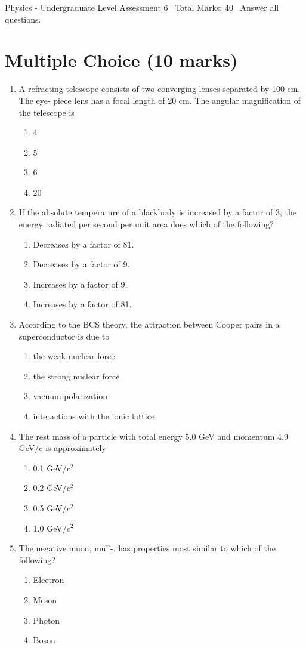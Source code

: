 \documentclass[12pt]{article}
\begin{document}
\begin{center}
Physics - Undergraduate Level Assessment 6 \
Total Marks: 40 \
Answer all questions.
\end{center}

\section*{Multiple Choice (10 marks)}
\begin{enumerate}[label=\arabic*.]
\item A refracting telescope consists of two converging lenses separated by 100 cm. The eye- piece lens has a focal length of 20 cm. The angular magnification of the telescope is
\begin{enumerate}[label=(\alph*)]
    \item 4
    \item 5
    \item 6
    \item 20
\end{enumerate}
\item If the absolute temperature of a blackbody is increased by a factor of 3, the energy radiated per second per unit area does which of the following?
\begin{enumerate}[label=(\alph*)]
    \item Decreases by a factor of 81.
    \item Decreases by a factor of 9.
    \item Increases by a factor of 9.
    \item Increases by a factor of 81.
\end{enumerate}
\item According to the BCS theory, the attraction between Cooper pairs in a superconductor is due to
\begin{enumerate}[label=(\alph*)]
    \item the weak nuclear force
    \item the strong nuclear force
    \item vacuum polarization
    \item interactions with the ionic lattice
\end{enumerate}
\item The rest mass of a particle with total energy 5.0 GeV and momentum 4.9 GeV/c is approximately
\begin{enumerate}[label=(\alph*)]
    \item 0.1 GeV/$c^2$
    \item 0.2 GeV/$c^2$
    \item 0.5 GeV/$c^2$
    \item 1.0 GeV/$c^2$
\end{enumerate}
\item The negative muon, mu^-, has properties most similar to which of the following?
\begin{enumerate}[label=(\alph*)]
    \item Electron
    \item Meson
    \item Photon
    \item Boson
\end{enumerate}
\end{enumerate}
\end{document}
